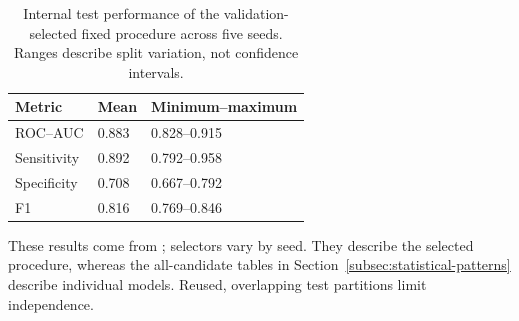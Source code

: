 \begin{table}[H]
\centering\small
\caption{Internal test performance of the validation-selected fixed procedure across five seeds. Ranges describe split variation, not confidence intervals.}
\begin{tabular}{lll}
\toprule
Metric & Mean & Minimum--maximum \\
\midrule
ROC--AUC & 0.883 & 0.828--0.915 \\
Sensitivity & 0.892 & 0.792--0.958 \\
Specificity & 0.708 & 0.667--0.792 \\
F1 & 0.816 & 0.769--0.846 \\
\bottomrule
\end{tabular}
\end{table}

These results come from ; selectors vary by seed. They describe the selected procedure, whereas the all-candidate tables in Section~\ref{subsec:statistical-patterns} describe individual models. Reused, overlapping test partitions limit independence.
